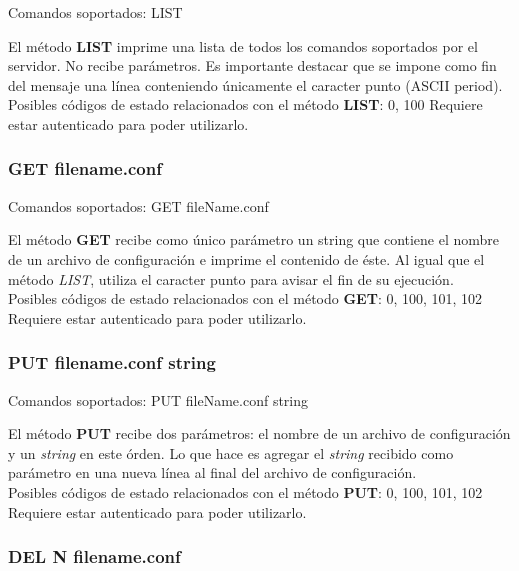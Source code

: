 \documentclass{beamer}
\begin{document}
\begin{frame}{Comandos soportados: LIST}

\par El método \textbf{LIST} imprime una lista de todos los comandos soportados por el servidor. No recibe parámetros. Es importante destacar que se impone como fin del mensaje una línea conteniendo únicamente el caracter punto (ASCII period).\\[0.5cm]
Posibles códigos de estado relacionados con el método \textbf{LIST}: 0, 100
Requiere estar autenticado para poder utilizarlo.
\end{frame}

\subsubsection{GET filename.conf}

\begin{frame}{Comandos soportados: GET fileName.conf}

\par El método \textbf{GET} recibe como único parámetro un string que contiene el nombre de un archivo de configuración e imprime el contenido de éste. Al igual que el método \textit{LIST}, utiliza el caracter punto para avisar el fin de su ejecución.\\[0.5cm]
Posibles códigos de estado relacionados con el método \textbf{GET}: 0, 100, 101, 102
Requiere estar autenticado para poder utilizarlo.
\end{frame}

\subsubsection{PUT filename.conf string}

\begin{frame}{Comandos soportados: PUT fileName.conf string}

\par El método \textbf{PUT} recibe dos parámetros: el nombre de un archivo de configuración y un \textit{string} en este órden. Lo que hace es agregar el \textit{string} recibido como parámetro en una nueva línea al final del archivo de configuración.\\[0.5cm]
Posibles códigos de estado relacionados con el método \textbf{PUT}: 0, 100, 101, 102
Requiere estar autenticado para poder utilizarlo.
\end{frame}

\subsubsection{DEL N filename.conf}
\end{document}
